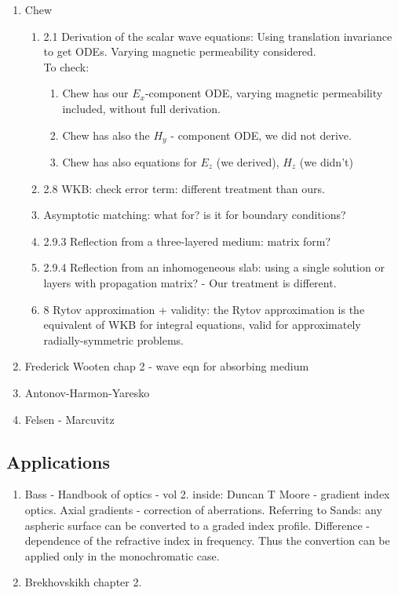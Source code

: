 \documentclass[twocolumn,secnumarabic,amssymb, nobibnotes, aps, prd]{revtex4-1}
\begin{document}
\begin{enumerate}
\item Chew
\begin{enumerate}
\item 2.1 Derivation of the scalar wave equations: Using translation invariance to get ODEs. Varying magnetic permeability considered.\\ 
To check: 
\begin{enumerate}
\item Chew has our $E_x$-component ODE, varying magnetic permeability included, without full derivation.
\item Chew has also the $H_y$ - component ODE, we did not derive.
\item Chew has also equations for $E_z$ (we derived), $H_z$ (we didn't) 
\end{enumerate} 
\item 2.8 WKB: check error term: different  treatment than ours. 
\item Asymptotic matching: what for? is it for boundary conditions?
\item 2.9.3 Reflection from a three-layered medium: matrix form? 
\item 2.9.4 Reflection from an inhomogeneous slab: using a single solution or layers with propagation matrix? - Our treatment is different.
\item 8 Rytov approximation + validity: the Rytov approximation is the equivalent of WKB for integral equations, valid for approximately radially-symmetric problems.
\end{enumerate}
 
\item Frederick Wooten chap 2 - wave eqn for absorbing medium
\item Antonov-Harmon-Yaresko
\item Felsen - Marcuvitz






\end{enumerate}

\subsection{Applications}
\begin{enumerate}
\item Bass - Handbook of optics - vol 2. inside: Duncan T Moore - gradient index optics. Axial gradients - correction of aberrations. Referring to Sands: any aspheric surface can be converted to a graded index profile. Difference - dependence of the refractive index in frequency. Thus the convertion can be  applied only in the monochromatic case.\\
\item Brekhovskikh \cite{Brekhovskikh1960} chapter 2.
\end{enumerate}
\end{document}
